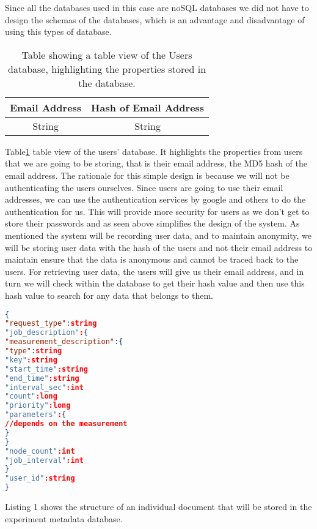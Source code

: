 Since all the databases used in this case are noSQL databases we did not have to design the schemas of the databases, which is an advantage and disadvantage of using this types of database.
\begin{table}[h!]
    \begin{center}
        \caption{Table showing a table view of the Users database, highlighting the properties stored in the database.}
        \label{tab:usertable}
        \begin{tabular}{c|c}
            \hline
            \textbf{Email Address} & \textbf{Hash of Email Address}\\
            \hline
            String & String\\
            \hline
        \end{tabular}
    \end{center}
\end{table}
Table\ref{tab:usertable} table view of the users' database.
It highlights the properties from users that we are going to be storing, that is their email address, the MD5 hash of the email address.
The rationale for this simple design is because we will not be authenticating the users ourselves.
Since users are going to use their email addresses, we can use the authentication services by google and others to do the authentication for us.
This will provide more security for users as we don't get to store their passwords and as seen above simplifies the design of the system.
As mentioned the system will be recording user data, and to maintain anonymity, we will be storing user data with the hash of the users and not their email address to maintain ensure that the data is anonymous and cannot be traced back to the users.
For retrieving user data, the users will give us their email address, and in turn we will check within the database to get their hash value and then use this hash value to search for any data that belongs to them.
\begin{lstlisting}[language=json, caption=JSON structure showing how the experiment metada documetns stored in the database will look like]
{
"request_type":string
"job_description":{
"measurement_description":{
"type":string
"key":string
"start_time":string
"end_time":string
"interval_sec":int
"count":long
"priority":long
"parameters":{
//depends on the measurement
}
}
"node_count":int
"job_interval":int
}
"user_id":string
}
\end{lstlisting}
Listing 1 shows the structure of an individual document that will be stored in the experiment metadata database.

